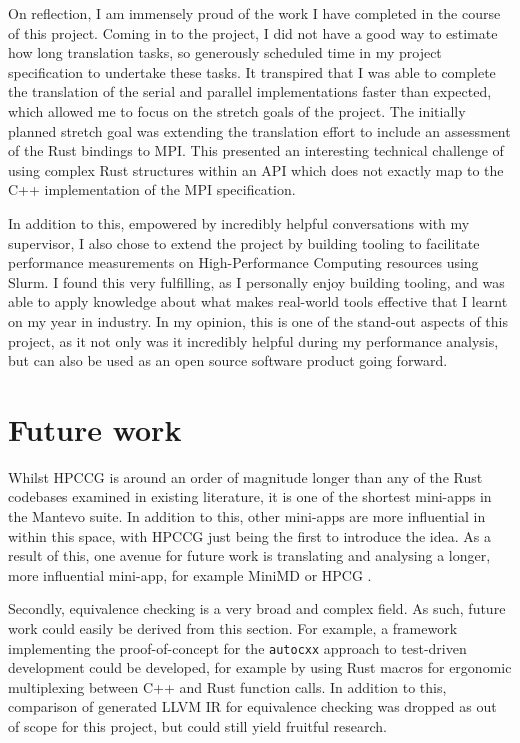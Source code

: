 On reflection, I am immensely proud of the work I have completed in the course of this project. Coming in to the project, I did not have a good way to estimate how long translation tasks, so generously scheduled time in my project specification to undertake these tasks. It transpired that I was able to complete the translation of the serial and parallel implementations faster than expected, which allowed me to focus on the stretch goals of the project. The initially planned stretch goal was extending the translation effort to include an assessment of the Rust bindings to MPI. This presented an interesting technical challenge of using complex Rust structures within an API which does not exactly map to the C++ implementation of the MPI specification.

In addition to this, empowered by incredibly helpful conversations with my supervisor, I also chose to extend the project by building tooling to facilitate performance measurements on High-Performance Computing resources using Slurm. I found this very fulfilling, as I personally enjoy building tooling, and was able to apply knowledge about what makes real-world tools effective that I learnt on my year in industry. In my opinion, this is one of the stand-out aspects of this project, as it not only was it incredibly helpful during my performance analysis, but can also be used as an open source software product going forward.


\section{Future work}
\label{sec:future-work}

Whilst HPCCG is around an order of magnitude longer than any of the Rust codebases examined in existing literature, it is one of the shortest mini-apps in the Mantevo suite. In addition to this, other mini-apps are more influential in within this space, with HPCCG just being the first to introduce the idea. As a result of this, one avenue for future work is translating and analysing a longer, more influential mini-app, for example MiniMD \cite{osti_1231191} or HPCG \cite{dongarra2015hpcg}.

Secondly, equivalence checking is a very broad and complex field. As such, future work could easily be derived from this section. For example, a framework implementing the proof-of-concept for the \texttt{autocxx} approach to test-driven development could be developed, for example by using Rust macros for ergonomic multiplexing between C++ and Rust function calls. In addition to this, comparison of generated LLVM IR for equivalence checking was dropped as out of scope for this project, but could still yield fruitful research.

